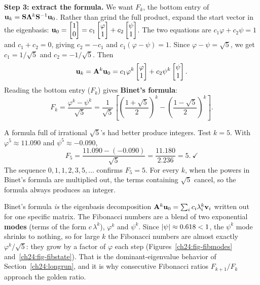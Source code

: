 \textbf{Step 3: extract the formula.} We want $F_k$, the bottom entry of
$\mathbf{u}_k = \mathbf{S}\mathbf{\Lambda}^k\mathbf{S}^{-1}\mathbf{u}_0$. Rather than grind the
full product, expand the start vector in the eigenbasis:
$\mathbf{u}_0 = \begin{bmatrix}1\\0\end{bmatrix} = c_1\begin{bmatrix}\varphi\\1\end{bmatrix} +
c_2\begin{bmatrix}\psi\\1\end{bmatrix}$. The two equations are $c_1\varphi + c_2\psi = 1$ and
$c_1 + c_2 = 0$, giving $c_2 = -c_1$ and $c_1(\varphi-\psi) = 1$. Since
$\varphi - \psi = \sqrt5$, we get $c_1 = 1/\sqrt5$ and $c_2 = -1/\sqrt5$. Then
\[
  \mathbf{u}_k = \mathbf{A}^k\mathbf{u}_0
  = c_1\varphi^k\begin{bmatrix}\varphi\\1\end{bmatrix} + c_2\psi^k\begin{bmatrix}\psi\\1\end{bmatrix}.
\]
Reading the bottom entry ($F_k$) gives \textbf{Binet's formula}:
\[
  \boxed{\;F_k = \frac{\varphi^k - \psi^k}{\sqrt5}
        = \frac{1}{\sqrt5}\!\left[\left(\frac{1+\sqrt5}{2}\right)^{\!k}
        - \left(\frac{1-\sqrt5}{2}\right)^{\!k}\right].\;}
\]

\begin{example}
\label{ch24:binet-check}
A formula full of irrational $\sqrt5$'s had better produce integers. Test
$k=5$. With $\varphi^5 \approx 11.090$ and $\psi^5 \approx -0.090$,
\[
  F_5 = \frac{11.090 - (-0.090)}{\sqrt5}
      = \frac{11.180}{2.236} = 5.\ \checkmark
\]
The sequence $0,1,1,2,3,5,\dots$ confirms $F_5 = 5$. For every $k$, when the
powers in Binet's formula are multiplied out, the terms containing $\sqrt5$
cancel, so the formula always produces an integer.
\end{example}

\begin{intuitionbox}
Binet's formula \emph{is} the eigenbasis decomposition $\mathbf{A}^k\mathbf{u}_0 =
\sum_i c_i\lambda_i^k\mathbf{v}_i$ written out for one specific matrix. The Fibonacci
numbers are a blend of two exponential \textbf{modes} (terms of the form
$c\,\lambda^k$), $\varphi^k$ and $\psi^k$.
Since $\lvert\psi\rvert\approx0.618<1$, the $\psi^k$ mode shrinks to nothing, so for
large $k$ the Fibonacci numbers are almost exactly $\varphi^k/\sqrt5$: they grow
by a factor of $\varphi$ each step (Figures~\ref{ch24:fig-fibmodes}
and~\ref{ch24:fig-fibstate}). That is the
dominant-eigenvalue behavior of
Section~\ref{ch24:longrun}, and it is why consecutive Fibonacci ratios
$F_{k+1}/F_k$ approach the golden ratio.
\end{intuitionbox}

